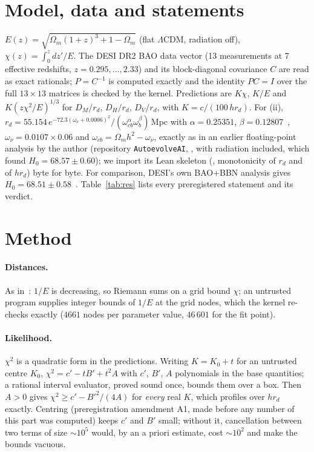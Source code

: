 \documentclass[11pt]{article}
\begin{document}
\section{Model, data and statements}
$E(z)=\sqrt{\Omega_m(1+z)^3+1-\Omega_m}$ (flat $\Lambda$CDM, radiation off), $\chi(z)=\int_0^z dz'/E$. The DESI DR2 BAO data vector
(13 measurements at 7 effective redshifts, $z=0.295,\dots,2.33$) and its block-diagonal covariance $C$ are read as exact rationals; $P=C^{-1}$ is computed exactly and the
identity $PC=I$ over the full $13\times13$ matrices is checked by the kernel. Predictions are $K\chi$, $K/E$ and $K(z\chi^2/E)^{1/3}$ for $D_M/r_d$, $D_H/r_d$, $D_V/r_d$,
with $K=c/(100\,h r_d)$. For (ii), $r_d=55.154\,e^{-72.3(\omega_\nu+0.0006)^2}/(\omega_{cb}^{\alpha}\omega_b^{\beta})$\,Mpc with $\alpha=0.25351$, $\beta=0.12807$~\cite{aubourg},
$\omega_\nu=0.0107\times0.06$ and $\omega_{cb}=\Omega_m h^2-\omega_\nu$, exactly as in an earlier floating-point analysis by the author (repository \texttt{AutoevolveAI},
, with radiation included, which found $H_0=68.57\pm0.60$); we import its Lean skeleton (,
monotonicity of $r_d$ and of $h r_d$) byte for byte. For comparison, DESI's own BAO+BBN analysis gives $H_0=68.51\pm0.58$~\cite{desi}. Table~\ref{tab:res} lists every
preregistered statement and its verdict.

\begin{table}[h]\centering\small

\caption{Results (from \texttt{results/certified\_numerics/P2\_likelihood/result.json} and \texttt{P3\_h0/result.json}).}\label{tab:res}
\end{table}

\section{Method}
\paragraph{Distances.} As in~\cite{p1}: $1/E$ is decreasing, so Riemann sums on a grid bound $\chi$; an untrusted program supplies integer bounds of $1/E$ at the grid
nodes, which the kernel re-checks exactly ($4661$ nodes per parameter value, $46\,601$ for the fit point).

\paragraph{Likelihood.} $\chi^2$ is a quadratic form in the predictions. Writing $K=K_0+t$ for an untrusted centre $K_0$, $\chi^2=c'-tB'+t^2A$ with $c'$, $B'$, $A$ polynomials in
the base quantities; a rational interval evaluator, proved sound once, bounds them over a box. Then $A>0$ gives $\chi^2\ge c'-B'^2/(4A)$ for \emph{every} real $K$, which
profiles over $h r_d$ exactly. Centring (preregistration amendment A1, made before any number of this part was computed) keeps $c'$ and $B'$ small; without it, cancellation
between two terms of size $\sim10^5$ would, by an a priori estimate, cost $\sim10^2$ and make the bounds vacuous.
\end{document}
